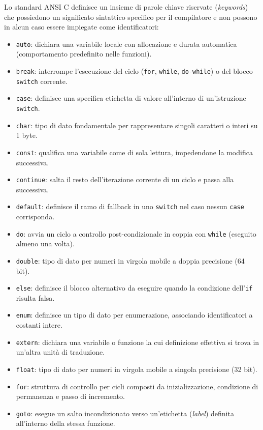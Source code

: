 Lo standard ANSI C definisce un insieme di parole chiave riservate (\textit{keywords}) che possiedono un significato sintattico specifico per il compilatore e non possono in alcun caso essere impiegate come identificatori:
\begin{itemize}
	\item \texttt{auto}: dichiara una variabile locale con allocazione e durata automatica (comportamento predefinito nelle funzioni).
	\item \texttt{break}: interrompe l'esecuzione del ciclo (\texttt{for}, \texttt{while}, \texttt{do-while}) o del blocco \texttt{switch} corrente.
	\item \texttt{case}: definisce una specifica etichetta di valore all'interno di un'istruzione \texttt{switch}.
	\item \texttt{char}: tipo di dato fondamentale per rappresentare singoli caratteri o interi su 1 byte.
	\item \texttt{const}: qualifica una variabile come di sola lettura, impedendone la modifica successiva.
	\item \texttt{continue}: salta il resto dell'iterazione corrente di un ciclo e passa alla successiva.
	\item \texttt{default}: definisce il ramo di fallback in uno \texttt{switch} nel caso nessun \texttt{case} corrisponda.
	\item \texttt{do}: avvia un ciclo a controllo post-condizionale in coppia con \texttt{while} (eseguito almeno una volta).
	\item \texttt{double}: tipo di dato per numeri in virgola mobile a doppia precisione (64 bit).
	\item \texttt{else}: definisce il blocco alternativo da eseguire quando la condizione dell'\texttt{if} risulta falsa.
	\item \texttt{enum}: definisce un tipo di dato per enumerazione, associando identificatori a costanti intere.
	\item \texttt{extern}: dichiara una variabile o funzione la cui definizione effettiva si trova in un'altra unità di traduzione.
	\item \texttt{float}: tipo di dato per numeri in virgola mobile a singola precisione (32 bit).
	\item \texttt{for}: struttura di controllo per cicli composti da inizializzazione, condizione di permanenza e passo di incremento.
	\item \texttt{goto}: esegue un salto incondizionato verso un'etichetta (\textit{label}) definita all'interno della stessa funzione.

\end{itemize}
